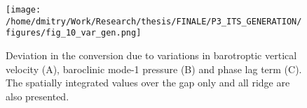 \documentclass[12pt]{article}
\newcommand{\SCALEO}{2}
\begin{document}
\begin{figure}
	\centering
	\texttt{[image: /home/dmitry/Work/Research/thesis/FINALE/P3\_ITS\_GENERATION/figures/fig\_10\_var\_gen.png]}
	\caption{Deviation in the conversion due to variations in barotroptic vertical velocity (A), 
	baroclinic mode-1 pressure (B) and phase lag term (C). The spatially integrated values over the 
	gap only and all ridge are also presented.}
	\label{C3.fig:var_sp}
\end{figure}



\end{document}
